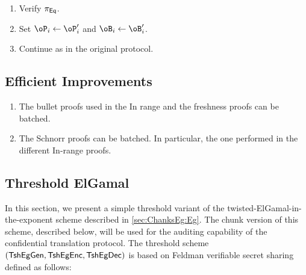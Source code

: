 \begin{enumerate}
\begin{enumerate}
\begin{enumerate}
					\item Verify $\pi_{\sf Eq}$.
				
				\item Set $\oP_i  \asn \oP_i'$  and $\oB_i  \asn \oB_i'$.
				
				\item Continue as in the original protocol.
			\end{enumerate}
		
	\end{enumerate}
\end{enumerate}


\subsection{Efficient Improvements}\label{sec:ChanksEg:EfficientImp}

\begin{enumerate}
	\item The bullet proofs used  in the In range and the freshness proofs can be batched. 
	
	\item The Schnorr proofs can be batched. In particular, the one performed in the different In-range proofs.  
\end{enumerate}


\subsection{Threshold  ElGamal}\label{sec:ChanksEg:TshEg}	
In this section, we present a simple   threshold variant of the twisted-ElGamal-in-the-exponent  scheme described in \cref{sec:ChanksEg:Eg}. The chunk version of this scheme, described below, will be used for the  auditing capability  of the confidential translation protocol. The threshold scheme  $(\mathsf{TshEgGen},\mathsf{TshEgEnc},\mathsf{TshEgDec})$ is based on Feldman verifiable secret sharing defined as follows:



